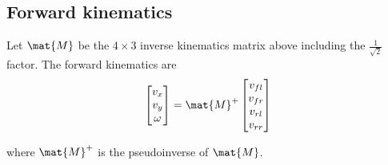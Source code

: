 \subsection{Forward kinematics}

Let $\mat{M}$ be the $4 \times 3$ inverse kinematics matrix above including the
$\frac{1}{\sqrt{2}}$ factor. The forward kinematics are
\begin{equation}
  \begin{bmatrix}
    v_x \\
    v_y \\
    \omega
  \end{bmatrix} =
  \mat{M}^+
  \begin{bmatrix}
    v_{fl} \\
    v_{fr} \\
    v_{rl} \\
    v_{rr}
  \end{bmatrix}
\end{equation}

where $\mat{M}^+$ is the pseudoinverse of $\mat{M}$.
